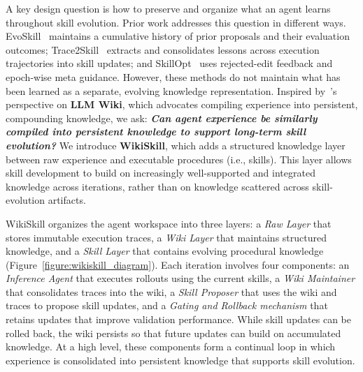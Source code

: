 \documentclass[11pt, a4paper, copyright, gr]{google}
\newcommand{\method}{WikiSkill\xspace}
\begin{document}
A key design question is how to preserve and organize what an agent learns throughout skill evolution. Prior work addresses this question in different ways. EvoSkill~\citep{alzubi2026evoskill} maintains a cumulative history of prior proposals and their evaluation outcomes; Trace2Skill~\citep{ni2026trace2skill} extracts and consolidates lessons across execution trajectories into skill updates; and SkillOpt~\citep{yang2026skillopt} uses rejected-edit feedback and epoch-wise meta guidance. However, these methods do not maintain what has been learned as a separate, evolving knowledge representation. Inspired by~\citet{karpathy2026llmwiki}'s perspective on \textbf{LLM Wiki}, which advocates compiling experience into persistent, compounding knowledge, we ask: \emph{\textbf{Can agent experience be similarly compiled into persistent knowledge to support long-term skill evolution?}} We introduce \textbf{\method}, which adds a structured knowledge layer between raw experience and executable procedures (i.e., skills). This layer allows skill development to build on increasingly well-supported and integrated knowledge across iterations, rather than on knowledge scattered across skill-evolution artifacts.

\method organizes the agent workspace into three layers: a \emph{Raw Layer} that stores immutable execution traces, a \emph{Wiki Layer} that maintains structured knowledge, and a \emph{Skill Layer} that contains evolving procedural knowledge (Figure~\ref{figure:wikiskill_diagram}). Each iteration involves four components: an \emph{Inference Agent} that executes rollouts using the current skills, a \emph{Wiki Maintainer} that consolidates traces into the wiki, a \emph{Skill Proposer} that uses the wiki and traces to propose skill updates, and a \emph{Gating and Rollback mechanism} that retains updates that improve validation performance. While skill updates can be rolled back, the wiki persists so that future updates can build on accumulated knowledge. At a high level, these components form a continual loop in which experience is consolidated into persistent knowledge that supports skill evolution.
\end{document}
